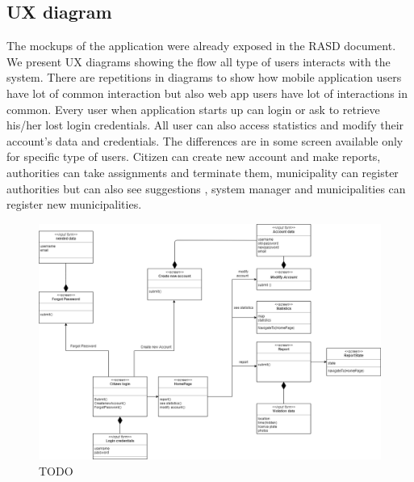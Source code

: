 \subsection{UX diagram}
The mockups of the application were already exposed in the RASD document.
\newline
We present UX diagrams showing the flow all type of users interacts with the system. 
There are repetitions in diagrams to show how mobile application users have lot of common interaction but also web app users have lot of interactions in common.
Every user when application starts up can login or ask to retrieve his/her lost login credentials.
All user can also access statistics and modify their account's data and credentials.
The differences are in some screen available only for specific type of users.
Citizen can create new account and make reports, authorities can take assignments and terminate them, municipality can register  authorities but can also see suggestions , system manager and municipalities can register new municipalities. 
\begin{figure}[h]
\centering
\includegraphics[width=\textwidth]{Images/ux1-correct.png}
\caption{\label{fig:ls}TODO }
\end{figure}

